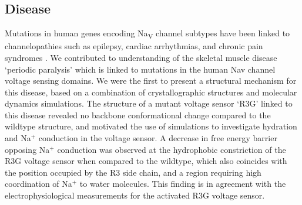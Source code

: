 \begin{refsection}
\section{Disease}


Mutations in human genes encoding Na\textsubscript{V} channel subtypes have been linked to channelopathies such as epilepsy, cardiac arrhythmias, and chronic pain syndromes \cite{Ashcroft:2000ts,Catterall:2008bz,JurkatRott:2010eo}. We contributed to understanding of the skeletal muscle disease `periodic paralysis' which is linked to mutations in the human Nav channel voltage sensing domains. We were the first to present a structural mechanism for this disease, based on a combination of crystallographic structures and molecular dynamics simulations. The structure of a mutant voltage sensor `R3G' linked to this disease revealed no backbone conformational change compared to the wildtype structure, and motivated the use of simulations to investigate hydration and Na$^+$ conduction in the voltage sensor. A decrease in free energy barrier opposing Na$^+$ conduction was observed at the hydrophobic constriction of the R3G voltage sensor when compared to the wildtype, which also coincides with the position occupied by the R3 side chain, and a region requiring high coordination of Na$^+$ to water molecules. This finding is in agreement with the electrophysiological measurements for the activated R3G voltage sensor. 


\end{refsection}
